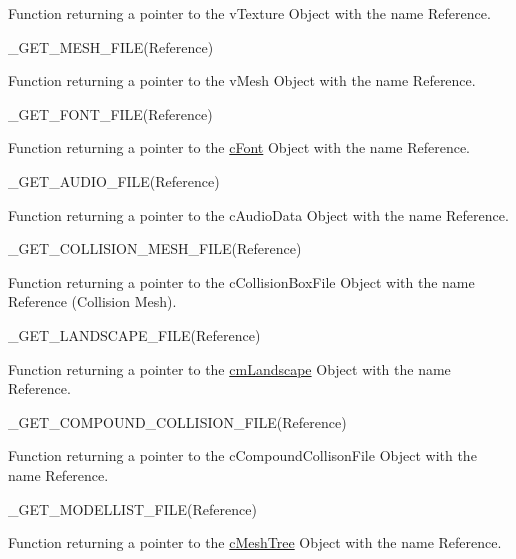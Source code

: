 \begin{DoxyItemize}
\begin{DoxyItemize}
\item Function returning a pointer to the vTexture Object with the name Reference.
\end{DoxyItemize}
\item \_\-GET\_\-MESH\_\-FILE(Reference)
\begin{DoxyItemize}
\item Function returning a pointer to the vMesh Object with the name Reference.
\end{DoxyItemize}
\item \_\-GET\_\-FONT\_\-FILE(Reference)
\begin{DoxyItemize}
\item Function returning a pointer to the \hyperlink{classc_font}{cFont} Object with the name Reference.
\end{DoxyItemize}
\item \_\-GET\_\-AUDIO\_\-FILE(Reference)
\begin{DoxyItemize}
\item Function returning a pointer to the cAudioData Object with the name Reference.
\end{DoxyItemize}
\item \_\-GET\_\-COLLISION\_\-MESH\_\-FILE(Reference)
\begin{DoxyItemize}
\item Function returning a pointer to the cCollisionBoxFile Object with the name Reference (Collision Mesh).
\end{DoxyItemize}
\item \_\-GET\_\-LANDSCAPE\_\-FILE(Reference)
\begin{DoxyItemize}
\item Function returning a pointer to the \hyperlink{classcm_landscape}{cmLandscape} Object with the name Reference.
\end{DoxyItemize}
\end{DoxyItemize}
\begin{DoxyItemize}
\item \_\-GET\_\-COMPOUND\_\-COLLISION\_\-FILE(Reference)
\begin{DoxyItemize}
\item Function returning a pointer to the cCompoundCollisonFile Object with the name Reference.
\end{DoxyItemize}
\end{DoxyItemize}
\begin{DoxyItemize}
\item \_\-GET\_\-MODELLIST\_\-FILE(Reference)
\begin{DoxyItemize}
\item Function returning a pointer to the \hyperlink{classc_mesh_tree}{cMeshTree} Object with the name Reference.
\end{DoxyItemize}
\end{DoxyItemize}
